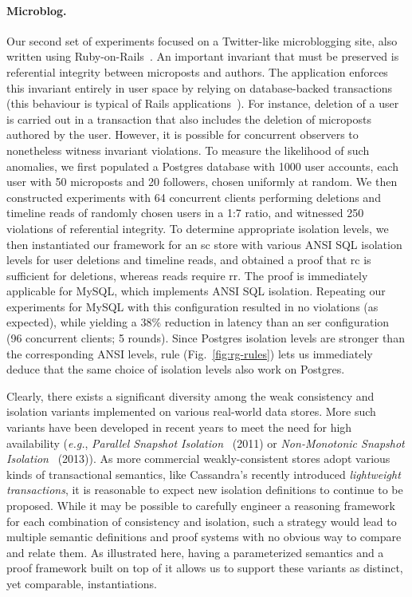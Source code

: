\paragraph{Microblog.} Our second set of experiments focused on a Twitter-like microblogging
site, also written using Ruby-on-Rails~\cite{railsbook}.  An important
invariant that must be preserved is referential
integrity between microposts and authors. The application enforces
this invariant entirely in user space by relying on database-backed
transactions (this behaviour is typical of Rails
applications~\cite{bailisferal}).  For instance, deletion of a user is
carried out in a transaction that also includes the deletion of
microposts authored by the user.  However, it is possible for concurrent observers 
to nonetheless witness invariant violations. To measure
the likelihood of such anomalies, we first populated a Postgres
database with 1000 user accounts, each user with 50 microposts and 20
followers, chosen uniformly at random. We then constructed experiments
with 64 concurrent clients performing deletions and timeline reads of
randomly chosen users in a 1:7 ratio, and witnessed 250 violations of
referential integrity. To determine appropriate isolation levels, we
then instantiated our framework for an {\sc sc} store with various
ANSI SQL isolation levels for user deletions and timeline reads, and
obtained a proof that {\sc rc} is sufficient for deletions, whereas
reads require {\sc rr}. The proof is immediately applicable for MySQL,
which implements ANSI SQL isolation. Repeating our experiments
for MySQL with this configuration resulted in no violations (as
expected), while yielding a 38\% reduction in latency than an {\sc
  ser} configuration (96 concurrent clients; 5 rounds).  Since
Postgres isolation levels are stronger than the corresponding ANSI
levels,  rule (Fig.~\ref{fig:rg-rules}) lets us
immediately deduce that the same choice of isolation levels also work
on Postgres.

Clearly, there exists a significant diversity among the weak
consistency and isolation variants implemented on various real-world
data stores. More such variants have been developed in recent years to
meet the need for high availability (\emph{e.g.}, \emph{Parallel
  Snapshot Isolation}~\cite{psi} (2011) or \emph{Non-Monotonic
  Snapshot Isolation}~\cite{nmsi} (2013)).  As more commercial
weakly-consistent stores adopt various kinds of transactional
semantics, like Cassandra's recently introduced \emph{lightweight
  transactions}, it is reasonable to expect new isolation
definitions to continue to be proposed.  While it may be possible to
carefully engineer a reasoning framework for each combination of
consistency and isolation, such a strategy would lead to multiple
semantic definitions and proof systems with no obvious way to compare
and relate them. As illustrated here, having a parameterized semantics
and a proof framework built on top of it allows us to support these
variants as distinct, yet comparable, instantiations.





